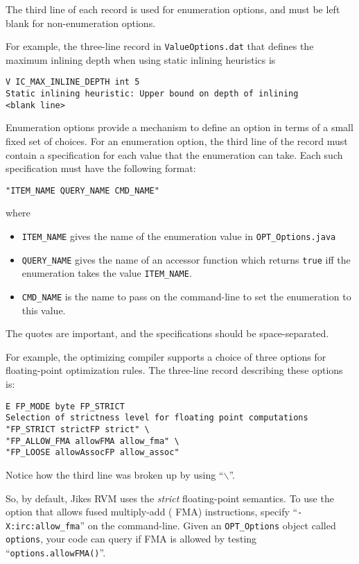 The third line of each record is used for enumeration options, and must
be left blank for non-enumeration options.

For example, the three-line record in {\tt ValueOptions.dat}
that defines the maximum inlining depth when using static inlining
heuristics is
\begin{verbatim}
V IC_MAX_INLINE_DEPTH int 5
Static inlining heuristic: Upper bound on depth of inlining
<blank line>
\end{verbatim}

Enumeration options provide a mechanism to define an option in terms of 
a small fixed set of choices.  For an enumeration option, the third line
of the record must contain a specification for each value that the
enumeration can take.  Each such specification must have the following
format:
\begin{verbatim}
"ITEM_NAME QUERY_NAME CMD_NAME"
\end{verbatim}
where
\begin{itemize}
\item {\tt ITEM\_NAME} gives the name of the enumeration value in {\tt OPT\_Options.java}
\item {\tt QUERY\_NAME} gives the name of an accessor function which returns {\tt true} iff the enumeration takes the value {\tt ITEM\_NAME}.
\item {\tt CMD\_NAME} is the name to pass on the command-line to set the enumeration to this value.
\end{itemize}
The quotes are important, and the specifications should be
space-separated.

For example, the optimizing compiler supports a choice of three
options for floating-point optimization rules.  The three-line record
describing these options is:
\begin{verbatim}
E FP_MODE byte FP_STRICT
Selection of strictness level for floating point computations
"FP_STRICT strictFP strict" \
"FP_ALLOW_FMA allowFMA allow_fma" \
"FP_LOOSE allowAssocFP allow_assoc"
\end{verbatim}
Notice how the third line was broken up by using ``$\backslash$''.

So, by default, Jikes RVM uses the {\em strict} floating-point
semantics.  To use the option that allows fused multiply-add
({\texonly{\sc} FMA})
instructions, specify ``{\tt -X:irc:allow\_fma}'' on the command-line.
Given an {\tt OPT\_Options} object called {\tt options}, your code can
query if {\texonly{\sc} FMA} is allowed by testing ``{\tt op\-tions\-.al\-low\-F\-M\-A()}''.

